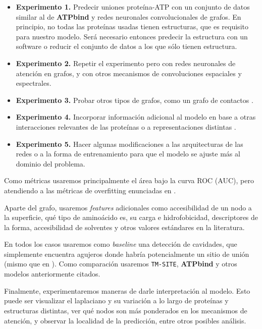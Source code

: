 \documentclass[
    left=2.0cm,         %
    right=2.0cm,        %
    top=2.0cm,          %
    bottom=2.5cm,         %
    bindingoffset=6mm,  %
    nohyphenation=false %
]{eiti/eiti-thesis}
\begin{document}
\begin{itemize}
    \item \textbf{Experimento 1.} Predecir uniones proteína-ATP con un conjunto de datos similar al de \textbf{ATPbind}
    \cite{atpbind} y redes neuronales convolucionales de grafos. En principio, no todas las proteínas usadas tienen estructuras, que 
    es requisito para nuestro modelo. Será necesario entonces predecir la estructura con
    un software o reducir el conjunto de datos a los que sólo tienen estructura. 
    \item \textbf{Experimento 2.} Repetir el experimento pero con redes neuronales
    de atención en grafos, y con otros mecanismos de convoluciones espaciales y
    espectrales.
    \item \textbf{Experimento 3.} Probar otros tipos de grafos, como un grafo de
    contactos \cite{fout2017proteininterface}. 
    \item \textbf{Experimento 4.} Incorporar información adicional al modelo en base
    a otras interacciones relevantes de las proteínas \cite{yang2012biolip} o a
    representaciones distintas \cite{keiser2009newtargetsknowndrugs}.
    \item \textbf{Experimento 5.} Hacer algunas modificaciones a las arquitecturas
    de las redes o a la forma de entrenamiento para que el modelo se ajuste más
    al dominio del problema.
\end{itemize}

Como métricas usaremos principalmente el área bajo la curva ROC (AUC), pero atendiendo
a las métricas de overfitting enunciadas en \cite{wallach2018overfitting}.

Aparte del grafo, usaremos \textit{features} adicionales como accesibilidad de un nodo
a la superficie, qué tipo de aminoácido es, su carga e hidrofobicidad, descriptores de la
forma, accesibilidad de solventes y otros valores estándares en la literatura.

En todos los casos usaremos como \textit{baseline} una detección de cavidades, que simplemente
encuentra agujeros donde habría potencialmente un sitio de unión (mismo que en \cite{yang2013tmsite}). Como comparación usaremos \texttt{TM-SITE}, \textbf{ATPbind}
y otros modelos anteriormente citados.

Finalmente, experimentaremos maneras de darle interpretación al modelo. Esto puede
ser visualizar el laplaciano y su variación a lo largo de proteínas y estructuras 
distintas,
ver qué nodos son más ponderados en los mecanismos de atención, y observar la localidad
de la predicción, entre otros posibles análisis.
\end{document}
